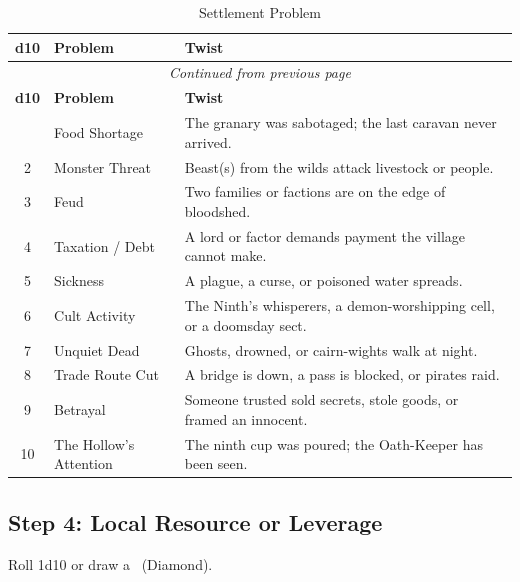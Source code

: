 \begin{center}
\begin{longtable}{clp{7cm}}
\caption{Settlement Problem}\\
\toprule
\textbf{d10} & \textbf{Problem} & \textbf{Twist} \\
\midrule
\endfirsthead
\multicolumn{3}{c}{\emph{Continued from previous page}} \\
\toprule
\textbf{d10} & \textbf{Problem} & \textbf{Twist} \\
\midrule
\endhead
\bottomrule
\endfoot
1 & Food Shortage & The granary was sabotaged; the last caravan never arrived. \\
2 & Monster Threat & Beast(s) from the wilds attack livestock or people. \\
3 & Feud & Two families or factions are on the edge of bloodshed. \\
4 & Taxation / Debt & A lord or factor demands payment the village cannot make. \\
5 & Sickness & A plague, a curse, or poisoned water spreads. \\
6 & Cult Activity & The Ninth's whisperers, a demon-worshipping cell, or a doomsday sect. \\
7 & Unquiet Dead & Ghosts, drowned, or cairn-wights walk at night. \\
8 & Trade Route Cut & A bridge is down, a pass is blocked, or pirates raid. \\
9 & Betrayal & Someone trusted sold secrets, stole goods, or framed an innocent. \\
10 & The Hollow's Attention & The ninth cup was poured; the Oath-Keeper has been seen. \\
\end{longtable}
\end{center}

\subsection{Step 4: Local Resource or Leverage}
\label{sec:settlement-resource}
Roll 1d10 or draw a \diamondsuit\ (Diamond).

